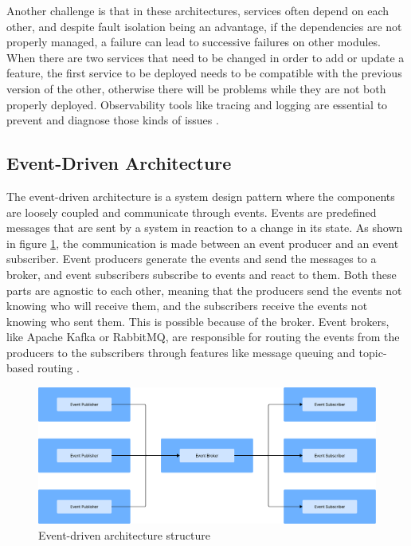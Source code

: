 Another challenge is that in these architectures, services often depend on each other,
and despite fault isolation being an advantage, if the dependencies are not
properly managed, a failure can lead to successive failures on other modules.
When there are two services that need to be changed in order to add or update
a feature, the first service to be deployed needs to be compatible with the
previous version of the other, otherwise there will be problems while they
are not both properly deployed.
Observability tools like tracing and logging are essential to prevent and
diagnose those kinds of issues \cite{richards2015software}.

\subsection{Event-Driven Architecture}
The event-driven architecture is a system design pattern where the components
are loosely coupled and communicate through events. Events are predefined
messages that are sent by a system in reaction to a change in its state.
As shown in figure \ref{fig:architectures:event-driven},
the communication is made between an event producer and an event subscriber.
Event producers generate the events and send the messages to a broker, and event
subscribers subscribe to events and react to them. Both these parts are agnostic
to each other, meaning that the producers send the events not knowing who will
receive them, and the subscribers receive the events not knowing who sent them.
This is possible because of the broker. Event brokers, like Apache Kafka or
RabbitMQ, are responsible for routing the events from the producers to the
subscribers through features like message queuing and topic-based routing \cite{manchana2021event,AWSEventDriven}.

\begin{figure}[htbp]
	\centering
	\includegraphics[width=\textwidth, height=0.5\textheight, keepaspectratio]{Chapters/Figures/Architectures/Event-driven.pdf}
	\caption{Event-driven architecture structure}
	\label{fig:architectures:event-driven}
\end{figure}

